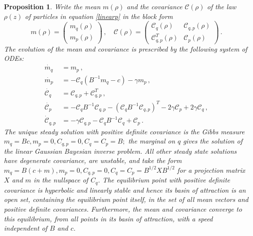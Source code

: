 \documentclass[12pt]{caltech_thesis}
\newtheorem{proposition}[theorem]{Proposition}
\numberwithin{equation}{section}
\begin{document}
\begin{proposition} 
\label{afli}
Write the mean $m(\rho)$ and the covariance $\mathcal{C}(\rho)$ of the law $\rho(z)$  of particles in equation \eqref{linearp} in the block form
$$m(\rho)=\begin{pmatrix}
m_q(\rho) \\
m_p(\rho)
\end{pmatrix}\,, \quad \mathcal{C}(\rho)=\begin{pmatrix}
\mathcal{C}_q(\rho) & \mathcal{C}_{q,p}(\rho) \\
\mathcal{C}_{q,p}^T(\rho) & \mathcal{C}_p(\rho)
\end{pmatrix}\,.$$ The evolution of the mean and covariance is prescribed by the following system of ODEs:
\begin{equation}
\label{vare}
\begin{aligned}
\dot{m_q}&= m_p\,, \\
\dot{m_p}&=-\mathcal{C}_q(B^{-1}m_q-c) - {\gamma}m_p\,,\\
\dot{\mathcal{C}_q}&=\mathcal{C}_{q,p}+\mathcal{C}_{q,p}^T\,,\\
\dot{\mathcal{C}_{p}}&=-\mathcal{C}_{q} B^{-1}\mathcal{C}_{q,p}-(\mathcal{C}_{q} B^{-1}\mathcal{C}_{q,p})^T- 2{\gamma}\mathcal{C}_{p}+2{\gamma}\mathcal{C}_{q}\,,\\
\dot{\mathcal{C}}_{q,p}&=- {\gamma}\mathcal{C}_{q,p} -\mathcal{C}_{q} B^{-1}\mathcal{C}_{q} +\mathcal{C}_{p}\,.
\end{aligned}
\end{equation}
{The unique steady solution with positive definite covariance is the Gibbs
measure $m_q=Bc, m_p=0, C_{q,p}=0, C_q=C_p=B;$ the marginal on $q$ gives the
solution of the linear Gaussian Bayesian inverse problem.
All other steady state solutions have degenerate covariance, are unstable, and take the
form $m_q=B(c+m), m_p=0, C_{q,p}=0, C_q=C_p=B^{1/2}XB^{1/2}$ for a projection matrix $X$ 
 and $m$ in the nullspace of $C_q$.
 The equilibrium point with positive definite covariance is hyperbolic
and linearly stable and hence its basin of attraction is an open set, containing
the equilibrium point itself, in the set of all mean vectors and 
positive definite
covariances. Furthermore, the mean and covariance converge to this equilibrium,
from all points in its basin of attraction, with a speed independent of $B$ and $c$.}  
\end{proposition} 
\vspace{0.1in}
\end{document}
